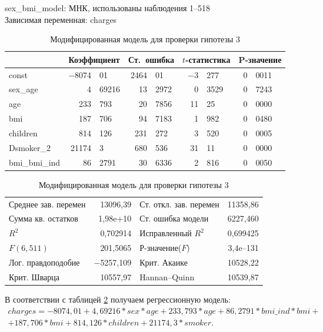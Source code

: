 \documentclass[a4paper,12pt]{article}
\begin{document}
\begin{table}[H]
	\begin{center}
		sex\_bmi\_model:
		МНК, использованы наблюдения 1--518\\
		Зависимая переменная: charges\\
		\vspace{1em}
		\begin{tabular}{|l|r@{,}l|r@{,}l|r@{,}l|r@{,}l|}
			\hline
			&
			\multicolumn{2}{c|}{Коэффициент} &
			\multicolumn{2}{c|}{Ст.\ ошибка} &
			\multicolumn{2}{c|}{$t$-статистика} &
			\multicolumn{2}{c|}{P-значение} \\[1ex]
			\hline
			const &	$-$8074&01 & 2464&01 & $-$3&277 & 0&0011 \\ \hline
			sex\_age & 4&69216 & 13&2972 & 0&3529 &	0&7243 \\ \hline
			age & 233&793 &	20&7856 & 11&25 & 0&0000 \\ \hline
			bmi & 187&706 & 94&7183 & 1&982 & 0&0480 \\ \hline
			children & 814&126 & 231&272 & 3&520 & 0&0005 \\ \hline
			Dsmoker\_2 & 21174&3 & 680&536 & 31&11 & 0&0000 \\ \hline
			bmi\_bmi\_ind & 86&2791 & 30&6336 & 2&816 &	0&0050 \\ \hline
		\end{tabular}
		\vspace{1ex}
		\begin{tabular}{lrlr}
			Среднее зав. перемен &  13096,39 & Ст. откл. зав. перемен &  11358,86 \\
			Сумма кв. остатков &  1,98\textrm{e+10} & Ст. ошибка модели &  6227,460 \\
			$R^2$ &  0,702914 & Исправленный $R^2$ &  0,699425 \\
			$F(6, 511)$ &  201,5065 & Р-значение($F$) &  3,4\textrm{e--131} \\
			Лог. правдоподобие & $-$5257,109 & Крит. Акаике &  10528,22 \\
			Крит. Шварца &  10557,97 & Hannan--Quinn &  10539,87 \\
		\end{tabular}
	\end{center}
	\caption{Модифицированная модель для проверки гипотезы 3}
	\label{tab:sex-bmi-model}
\end{table}

В соответствии с таблицей \ref{tab:sex-bmi-model} получаем регрессионную модель:
\begin{align*}
charges = -8074,01 + 4,69216 * sex * age + 233,793 * age + 86,2791 * bmi\_ind * bmi + \\ + 187,706 * bmi + 814,126 * children + 21174,3 * smoker.
\end{align*}
\end{document}
